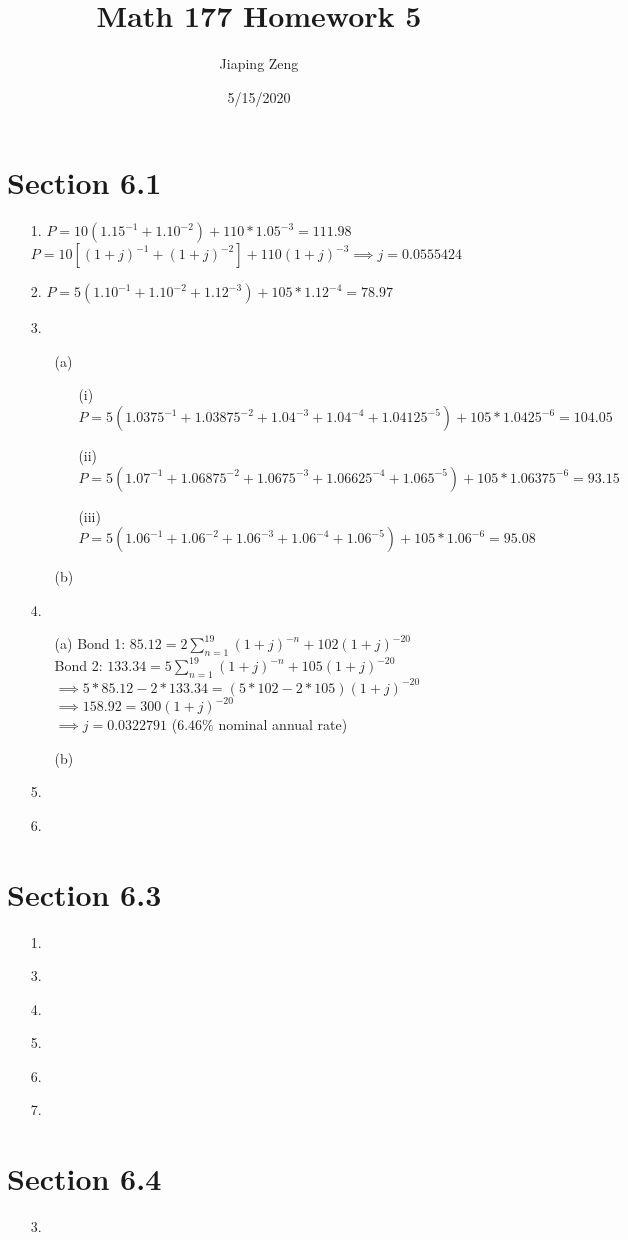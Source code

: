 \documentclass{article}
\title{Math 177 Homework 5}
\date{5/15/2020}
\author{Jiaping Zeng}
\begin{document}
\maketitle

\section*{Section 6.1}
\begin{itemize}
	\item [1.] $P=10(1.15^{-1}+1.10^{-2})+110*1.05^{-3}=\boxed{111.98}$\\$P=10[(1+j)^{-1}+(1+j)^{-2}]+110(1+j)^{-3} \implies \boxed{j=0.0555424}$
	\item [2.] $P=5(1.10^{-1}+1.10^{-2}+1.12^{-3})+105*1.12^{-4}=\boxed{78.97}$
	\item [3.]
	      \begin{itemize}
		      \item [(a)]
		            \begin{itemize}
			            \item [(i)] $P=5(1.0375^{-1}+1.03875^{-2}+1.04^{-3}+1.04^{-4}+1.04125^{-5})+105*1.0425^{-6}=\boxed{104.05}$
			            \item [(ii)] $P=5(1.07^{-1}+1.06875^{-2}+1.0675^{-3}+1.06625^{-4}+1.065^{-5})+105*1.06375^{-6}=\boxed{93.15}$
			            \item [(iii)] $P=5(1.06^{-1}+1.06^{-2}+1.06^{-3}+1.06^{-4}+1.06^{-5})+105*1.06^{-6}=\boxed{95.08}$
		            \end{itemize}
		      \item [(b)]
	      \end{itemize}
	\item [4.]
	      \begin{itemize}
		      \item [(a)]Bond 1: $85.12=2\sum_{n=1}^{19}(1+j)^{-n}+102(1+j)^{-20}$\\Bond 2: $133.34=5\sum_{n=1}^{19}(1+j)^{-n}+105(1+j)^{-20}$\\$\implies 5*85.12-2*133.34=(5*102-2*105)(1+j)^{-20}$\\$\implies 158.92=300(1+j)^{-20}$\\$\implies\boxed{j=0.0322791}$ ($6.46\%$ nominal annual rate)
		      \item [(b)]
	      \end{itemize}
	\item [5.]
	\item [6.]
\end{itemize}

\section*{Section 6.3}
\begin{itemize}
	\item [1.]
	\item [3.]
	\item [4.]
	\item [5.]
	\item [6.]
	\item [7.]
\end{itemize}

\section*{Section 6.4}
\begin{itemize}
	\item [3.]
\end{itemize}
\end{document}
